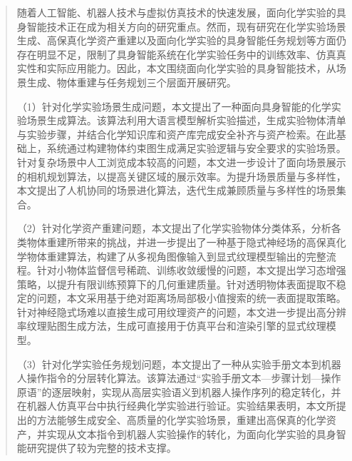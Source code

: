 

\begin{abstract}
随着人工智能、机器人技术与虚拟仿真技术的快速发展，面向化学实验的具身智能技术正在成为相关方向的研究重点。然而，现有研究在化学实验场景生成、高保真化学资产重建以及面向化学实验的具身智能任务规划等方面仍存在明显不足，限制了具身智能系统在化学实验任务中的训练效率、仿真真实性和实际应用能力。因此，本文围绕面向化学实验的具身智能技术，从场景生成、物体重建与任务规划三个层面开展研究。

（1）针对化学实验场景生成问题，本文提出了一种面向具身智能的化学实验场景生成算法。该算法利用大语言模型解析实验描述，生成实验物体清单与实验步骤，并结合化学知识库和资产库完成安全补齐与资产检索。在此基础上，系统通过构建物体约束图生成满足实验逻辑与安全要求的实验场景。针对复杂场景中人工浏览成本较高的问题，本文进一步设计了面向场景展示的相机规划算法，以提高关键区域的展示效率。为提升场景质量与多样性，本文提出了人机协同的场景进化算法，迭代生成兼顾质量与多样性的场景集合。

（2）针对化学资产重建问题，本文提出了化学实验物体分类体系，分析各类物体重建所带来的挑战，并进一步提出了一种基于隐式神经场的高保真化学物体重建算法，构建了从多视角图像输入到显式纹理模型输出的完整流程。针对小物体监督信号稀疏、训练收敛缓慢的问题，本文提出学习态增强策略，以提升有限训练预算下的几何重建质量。针对透明物体表面提取不稳定的问题，本文采用基于绝对距离场局部极小值搜索的统一表面提取策略。针对神经隐式场难以直接生成可用纹理资产的问题，本文进一步提出高分辨率纹理贴图生成方法，生成可直接用于仿真平台和渲染引擎的显式纹理模型。

（3）针对化学实验任务规划问题，本文提出了一种从实验手册文本到机器人操作指令的分层转化算法。该算法通过“实验手册文本—步骤计划—操作原语”的逐层映射，实现从高层实验语义到机器人操作序列的稳定转化，并在机器人仿真平台中执行经典化学实验进行验证。实验结果表明，本文所提出的方法能够生成安全、高质量的化学实验场景，重建出高保真的化学资产，并实现从文本指令到机器人实验操作的转化，为面向化学实验的具身智能研究提供了较为完整的技术支撑。
\end{abstract}



